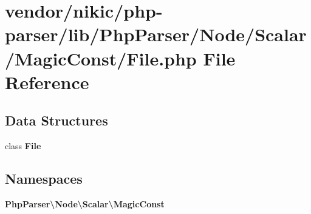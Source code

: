 \section{vendor/nikic/php-\/parser/lib/\+Php\+Parser/\+Node/\+Scalar/\+Magic\+Const/\+File.php File Reference}
\label{nikic_2php-parser_2lib_2_php_parser_2_node_2_scalar_2_magic_const_2_file_8php}
\subsection*{Data Structures}
\begin{DoxyCompactItemize}
\item 
class {\bf File}
\end{DoxyCompactItemize}
\subsection*{Namespaces}
\begin{DoxyCompactItemize}
\item 
 {\bf Php\+Parser\textbackslash{}\+Node\textbackslash{}\+Scalar\textbackslash{}\+Magic\+Const}
\end{DoxyCompactItemize}
